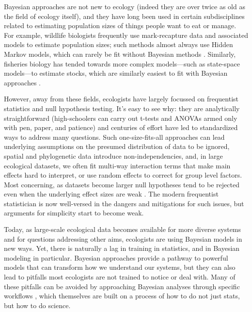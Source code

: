 \documentclass[11pt]{article}
\begin{document}
{Bayesian approaches are not new to ecology (indeed they are over twice as old as the field of ecology itself), and they have long been used in certain subdisciplines related to estimating population sizes of things people want to eat or manage. For example, wildlife biologists frequently use mark-recapture data and associated models to estimate population sizes; such methods almost always use Hidden Markov models, which can rarely be fit without Bayesian methods \citep{muthuku2008,zheng2007}. Similarly, fisheries biology has tended towards more complex models---such as state-space models---to estimate stocks, which are similarly easiest to fit with Bayesian approaches \citep{trijoulet2018,millar2000}. %

However, away from these fields, ecologists have largely focussed on frequentist statistics and null hypothesis testing. It's easy to see why: they are analytically straightforward (high-schoolers can carry out t-tests and ANOVAs armed only with pen, paper, and patience) and centuries of effort have led to standardized ways to address many questions. Such one-size-fits-all approaches can lead underlying assumptions on the presumed distribution of data to be ignored, spatial and phylogenetic data introduce non-independencies, and, in large ecological datasets, we often fit multi-way interaction terms that make main effects hard to interpret, or use random effects to correct for group level factors. Most concerning, as datasets become larger null hypotheses tend to be rejected even when the underlying effect sizes are weak \citep{gelmanhill,muff2022rewriting}. The modern frequentist statistician is now well-versed in the dangers and mitigations for such issues, but arguments for simplicity start to become weak.

Today, as large-scale ecological data becomes available for more diverse systems and for questions addressing other aims, ecologists are using Bayesian models in new ways. Yet, there is naturally a lag in training in statistics, and in Bayesian modeling in particular. Bayesian approaches provide a pathway to powerful models that can transform how we understand our systems, but they can also lead to pitfalls most ecologists are not trained to notice or deal with. Many of these pitfalls can be avoided by approaching Bayesian analyses through specific workflows \citep{betanworkflow,vandeschoot2021}, which themselves are built on a process of how to do not just stats, but how to do science. 

}
\end{document}
